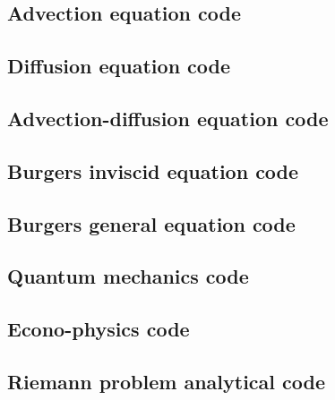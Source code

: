 \documentclass[twocolumn]{myarticle}
\begin{document}

\vspace{10pt}

\subsection{Advection equation code}
\label{subsec:advection_equation_code}


\vspace{10pt}

\subsection{Diffusion equation code}
\label{subsec:diffusion_equation_code}


\vspace{10pt}

\subsection{Advection-diffusion equation code}
\label{subsec:advection_diffusion_equation_code}


\vspace{10pt}

\subsection{Burgers inviscid equation code}
\label{subsec:burgers_inviscid_equation_code}


\vspace{10pt}

\subsection{Burgers general equation code}
\label{subsec:burgers_general_equation_code}


\vspace{10pt}

\subsection{Quantum mechanics code}
\label{subsec:quantum_mechanics_code}


\vspace{10pt}

\subsection{Econo-physics code}
\label{subsec:econo_physics_code}


\vspace{10pt}

\subsection{Riemann problem analytical code}
\label{subsec:riemann_problem_analytical_code}


\vspace{10pt}
\end{document}
